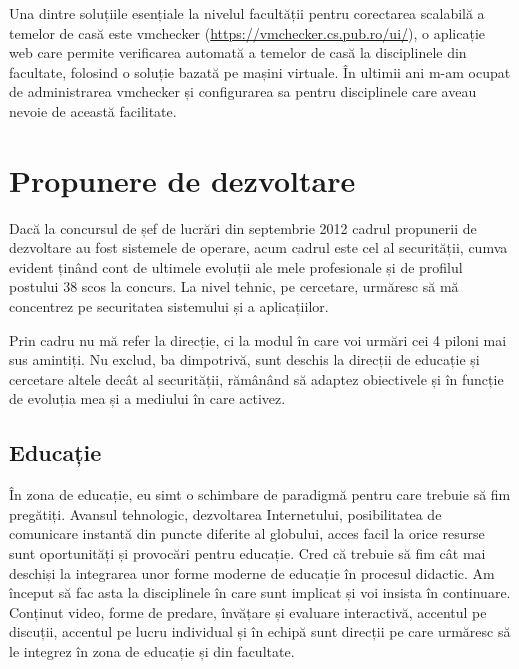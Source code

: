 \documentclass[11pt,a4paper]{article}
\begin{document}
Una dintre soluțiile esențiale la nivelul facultății pentru corectarea scalabilă a temelor de casă este vmchecker (\url{https://vmchecker.cs.pub.ro/ui/}), o aplicație web care permite verificarea automată a temelor de casă la disciplinele din facultate, folosind o soluție bazată pe mașini virtuale. În ultimii ani m-am ocupat de administrarea vmchecker și configurarea sa pentru disciplinele care aveau nevoie de această facilitate.

\section*{Propunere de dezvoltare}

Dacă la concursul de șef de lucrări din septembrie 2012 cadrul propunerii de dezvoltare au fost sistemele de operare, acum cadrul este cel al securității, cumva evident ținând cont de ultimele evoluții ale mele profesionale și de profilul postului 38 scos la concurs.  La nivel tehnic, pe cercetare, urmăresc să mă concentrez pe securitatea sistemului și a aplicațiilor.

Prin cadru nu mă refer la direcție, ci la modul în care voi urmări cei 4 piloni mai sus amintiți. Nu exclud, ba dimpotrivă, sunt deschis la direcții de educație și cercetare altele decât al securității, rămânând să adaptez obiectivele și în funcție de evoluția mea și a mediului în care activez.

\subsection*{Educație}

În zona de educație, eu simt o schimbare de paradigmă pentru care trebuie să fim pregătiți. Avansul tehnologic, dezvoltarea Internetului, posibilitatea de comunicare instantă din puncte diferite al globului, acces facil la orice resurse sunt oportunități și provocări pentru educație. Cred că trebuie să fim cât mai deschiși la integrarea unor forme moderne de educație în procesul didactic. Am început să fac asta la disciplinele în care sunt implicat și voi insista în continuare. Conținut video, forme de predare, învățare și evaluare interactivă, accentul pe discuții, accentul pe lucru individual și în echipă sunt direcții pe care urmăresc să le integrez în zona de educație și din facultate.
\end{document}
